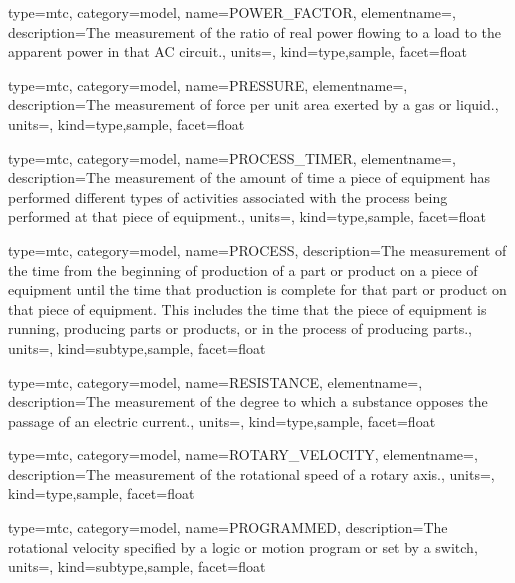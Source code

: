 {
  type=mtc,
  category=model,
  name={POWER\_FACTOR},
  elementname=,
  description={The measurement of the ratio of real power flowing to a load to the apparent power in that AC circuit.},
  units=,
  kind={type,sample},
  facet={\gls{float}}
}


{
  type=mtc,
  category=model,
  name={PRESSURE},
  elementname=,
  description={The measurement of force per unit area exerted by a gas or liquid.},
  units=,
  kind={type,sample},
  facet={\gls{float}}
}


{
  type=mtc,
  category=model,
  name={PROCESS\_TIMER},
  elementname=,
  description={The measurement of the amount of time a piece of equipment has performed different types of activities associated with the process being performed at that piece of equipment.},
  units=,
  kind={type,sample},
  facet={\gls{float}}
}




{
  type=mtc,
  category=model,
  name={PROCESS},
  description={The measurement of the time from the beginning of production of a part or product on a piece of equipment until the time that production is complete for that part or product on that piece of equipment.  This includes the time that the piece of equipment is running, producing parts or products, or in the process of producing parts.},
  units=,
  kind={subtype,sample},
  facet={\gls{float}}
}


{
  type=mtc,
  category=model,
  name={RESISTANCE},
  elementname=,
  description={The measurement of the degree to which a substance opposes the passage of an electric current.},
  units=,
  kind={type,sample},
  facet={\gls{float}}
}


{
  type=mtc,
  category=model,
  name={ROTARY\_VELOCITY},
  elementname=,
  description={The measurement of the rotational speed of a rotary axis.},
  units=,
  kind={type,sample},
  facet={\gls{float}}
}


{
  type=mtc,
  category=model,
  name={PROGRAMMED},
  description={The rotational velocity specified by a logic or motion program or set by a switch},
  units=,
  kind={subtype,sample},
  facet={\gls{float}}
}


